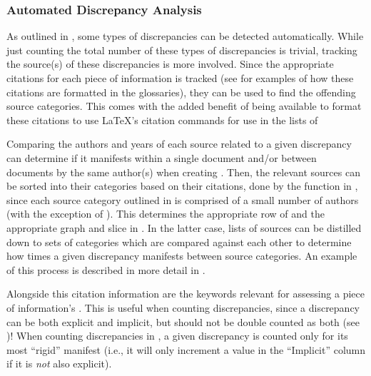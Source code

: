 \subsubsection{Automated Discrepancy Analysis}
\label{auto-discrep-analysis}

As outlined in , some types of discrepancies can be detected
automatically. While just counting the total number of these types of
discrepancies is trivial, tracking the source(s) of these discrepancies is more
involved. Since the appropriate citations for each piece of information is
tracked (see  for examples of
how these citations are formatted in the glossaries), they can be used to find
the offending source categories. This comes with the added benefit of being
available to format these citations to use \LaTeX{}'s citation commands for use
in the lists of \autoDiscreps[.]{}

Comparing the authors and years of each source related to a given discrepancy
can determine if it manifests within a single document and/or between documents
by the same author(s) when creating . Then, the
relevant sources can be sorted into their categories based on their citations,
done by the function in , since each source category
outlined in  is comprised of a small number of authors (with the
exception of ).
This determines the appropriate row of  and the appropriate
graph and slice in . In the latter case, lists of
sources can be distilled down to sets of categories which are compared against
each other to determine how times a given discrepancy manifests between source
categories. An example of this process is described in more detail in
.

Alongside this citation information are the keywords relevant for assessing a
piece of information's . This is useful when counting
discrepancies, since a discrepancy can be both explicit and implicit, but
should not be double counted as both (see )! When counting
discrepancies in , a given discrepancy is counted only for
its most ``rigid'' manifest (i.e., it will only increment a value in the
``Implicit'' column if it is \emph{not} also explicit).

